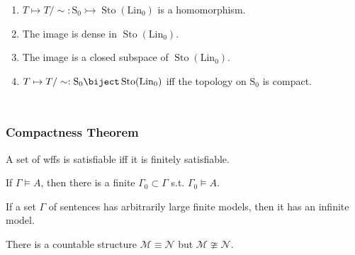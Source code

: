 \documentclass[UTF8,aspectratio=43,11pt,colorlinks,compress,openany]{beamer}%
\begin{document}
\begin{frame}
\begin{columns}[onlytextwidth]
{\begin{minipage}{\textwidth}
\begin{enumerate}
	\item $T\mapsto T/\sim:\mathrm{S_0}\rightarrowtail\operatorname{Sto}(\mathrm{Lin_0})$ is a homomorphism.
	\item The image is dense in $\operatorname{Sto}(\mathrm{Lin_0})$.
	\item The image is a closed subspace of $\operatorname{Sto}(\mathrm{Lin_0})$.
	\item $T\mapsto T/\sim:\mathrm{S_0}\biject\operatorname{Sto}(\mathrm{Lin_0})$ iff the topology on $\mathrm{S_0}$ is compact.
\end{enumerate}
\end{minipage}}
\end{columns}
\end{frame}

\begin{frame}\frametitle{Compactness Theorem}
	\begin{theorem}
		A set of wffs is satisfiable iff it is finitely satisfiable.
	\end{theorem}
	\begin{corollary}
		If $\Gamma\vDash A$, then there is a finite $\Gamma_0\subset\Gamma$ s.t. $\Gamma_0\vDash A$.
	\end{corollary}
	\begin{corollary}
		If a set $\Gamma$ of sentences has arbitrarily large finite models, then it has an infinite model.
	\end{corollary}
	\begin{corollary}
		There is a countable structure $\mathcal{M}\equiv\mathcal{N}$ but $\mathcal{M}\ncong\mathcal{N}$.
	\end{corollary}
\end{frame}
\end{document}
